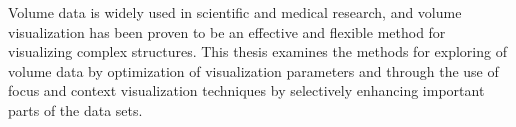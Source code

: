 \documentclass[a4paper, 12pt, oneside]{report}         %
\begin{document}
\begin{thesisabstract}
Volume data is widely used in scientific and medical research, and volume visualization has been proven to be an effective and flexible method for visualizing complex structures. This thesis examines the methods for exploring of volume data by optimization of visualization parameters and through the use of focus and context visualization techniques by selectively enhancing important parts of the data sets.



%
%




\end{thesisabstract}
\end{document}
